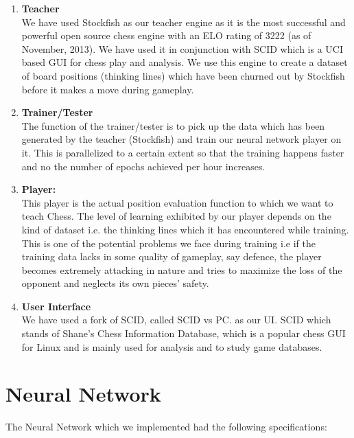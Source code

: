 \documentclass[a4paper,12pt,latin modern roman]{article}
\begin{document}
\begin{enumerate}
\item \textbf{Teacher}\\
We have used Stockfish as our teacher engine as it is the most successful and powerful open source chess engine with an ELO rating of 3222 (as of November, 2013). We have used it in conjunction with SCID which is a UCI based GUI for chess play and analysis. We use this engine to create a dataset of board positions (thinking lines) which have been churned out by Stockfish before it makes a move during gameplay. 
\item \textbf{Trainer/Tester}\\
The function of the trainer/tester is to pick up the data which has been generated by the teacher (Stockfish) and train our neural network player on it. This is parallelized to a certain extent so that the training happens faster and no the number of epochs achieved per hour increases.
\item \textbf{Player:}\\
This player is the actual position evaluation function to which we want to teach Chess. The level of learning exhibited by our player depends on the kind of dataset i.e. the thinking lines which it has encountered while training. This is one of the potential problems we face during training i.e if the training data lacks in some quality of gameplay, say defence, the player becomes extremely attacking in nature and tries to maximize the loss of the opponent and neglects its own pieces' safety. 
\item \textbf{User Interface}\\
We have used a fork of SCID, called SCID vs PC. as our UI. SCID which stands of Shane's Chess Information Database, which is a popular chess GUI for Linux and is mainly used for analysis and to study game databases. 
\end{enumerate}


\section{Neural Network}
The Neural Network which we implemented had the following specifications:
\end{document}
